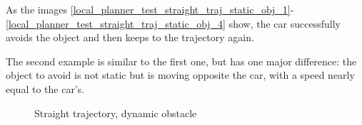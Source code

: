 As the images \ref{local_planner_test_straight_traj_static_obj_1}-\ref{local_planner_test_straight_traj_static_obj_4} show, the car successfully avoids the object and then keeps to the trajectory again.

The second example is similar to the first one, but has one major difference: the object to avoid is not static but is moving opposite the car, with a speed nearly equal to the car's.

\begin{figure}[!ht]
	\centering




	\caption{Straight trajectory, dynamic obstacle}
	\label{local_planner_test_straight_traj_dyn_obj}
\end{figure}

